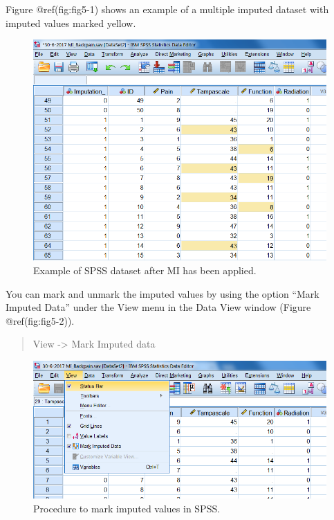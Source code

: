 \documentclass[
]{book}
\begin{document}
Figure @ref(fig:fig5-1) shows an example of a multiple imputed dataset
with imputed values marked yellow.

\begin{figure}

{\centering \includegraphics[width=0.9\linewidth]{images/fig5.1} 

}

\caption{Example of SPSS dataset after MI has been applied.}\label{fig:fig5-1}
\end{figure}

You can mark and unmark the imputed values by using the option ``Mark
Imputed Data'' under the View menu in the Data View window (Figure
@ref(fig:fig5-2)).

\begin{quote}
View -\textgreater{} Mark Imputed data
\end{quote}

\begin{figure}

{\centering \includegraphics[width=0.9\linewidth]{images/fig5.2} 

}

\caption{Procedure to mark imputed values in SPSS.}\label{fig:fig5-2}
\end{figure}
\end{document}
